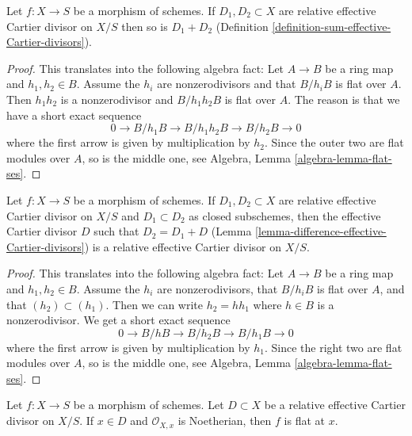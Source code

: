 \begin{lemma}
\label{lemma-sum-relative-effective-Cartier-divisor}
Let $f : X \to S$ be a morphism of schemes. If $D_1, D_2 \subset X$
are relative effective Cartier divisor on $X/S$ then so
is $D_1 + D_2$ (Definition \ref{definition-sum-effective-Cartier-divisors}).
\end{lemma}

\begin{proof}
This translates into the following algebra fact:
Let $A \to B$ be a ring map and $h_1, h_2 \in B$.
Assume the $h_i$ are nonzerodivisors and that $B/h_iB$ is flat over $A$.
Then $h_1h_2$ is a nonzerodivisor and $B/h_1h_2B$ is flat over $A$.
The reason is that we have a short exact sequence
$$
0 \to B/h_1B \to B/h_1h_2B \to B/h_2B \to 0
$$
where the first arrow is given by multiplication by $h_2$. Since
the outer two are flat modules over $A$, so is the middle one, see
Algebra, Lemma \ref{algebra-lemma-flat-ses}.
\end{proof}

\begin{lemma}
\label{lemma-difference-relative-effective-Cartier-divisor}
Let $f : X \to S$ be a morphism of schemes. If $D_1, D_2 \subset X$
are relative effective Cartier divisor on $X/S$ and $D_1 \subset D_2$
as closed subschemes, then the effective Cartier divisor $D$
such that $D_2 = D_1 + D$
(Lemma \ref{lemma-difference-effective-Cartier-divisors}) is
a relative effective Cartier divisor on $X/S$.
\end{lemma}

\begin{proof}
This translates into the following algebra fact:
Let $A \to B$ be a ring map and $h_1, h_2 \in B$.
Assume the $h_i$ are nonzerodivisors, that $B/h_iB$ is flat over $A$, and
that $(h_2) \subset (h_1)$. Then we can write $h_2 = h h_1$
where $h \in B$ is a nonzerodivisor. We get a short exact sequence
$$
0 \to B/hB \to B/h_2B \to B/h_1B \to 0
$$
where the first arrow is given by multiplication by $h_1$. Since
the right two are flat modules over $A$, so is the middle one, see
Algebra, Lemma \ref{algebra-lemma-flat-ses}.
\end{proof}

\begin{lemma}
\label{lemma-flat-at-x}
Let $f : X \to S$ be a morphism of schemes.
Let $D \subset X$ be a relative effective Cartier divisor on $X/S$.
If $x \in D$ and $\mathcal{O}_{X, x}$ is Noetherian, then $f$ is flat at $x$.
\end{lemma}

